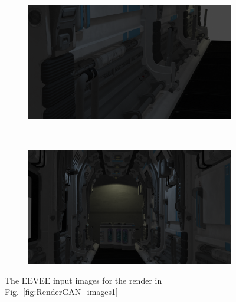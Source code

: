 \begin{figure}[h!]
    \centering
    \begin{subfigure}[b]{0.9\textwidth}
     \includegraphics[width=\textwidth]{figures/result/eevee/s9_camera_9_eevee.png}
     \caption{}\label{subfig:1}
    \end{subfigure}
    \\ \vspace{0.2cm}
    \begin{subfigure}[b]{0.9\textwidth}
     \includegraphics[width=\textwidth]{figures/result/eevee/s9_camera_80_eevee.png}
     \caption{}
    \end{subfigure}
\caption[EEVEE Example of input]{The EEVEE input images for the render in Fig.~\ref{fig:RenderGAN_images1}}
    \label{fig:eevee_images1}
\end{figure}
